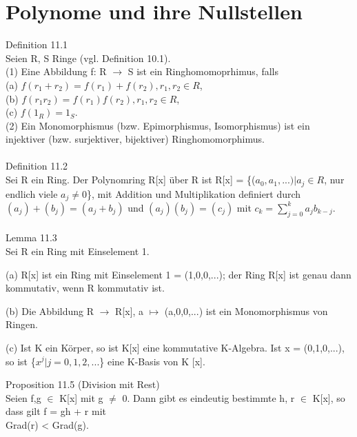 \documentclass[fontsize=10pt]{scrartcl}
\begin{document}
\section{Polynome und ihre Nullstellen}
Definition 11.1\\
Seien R, S Ringe (vgl. Definition 10.1).\\
(1) Eine Abbildung f: R $\to$ S ist ein Ringhomomoprhimus, falls\\
\hspace*{6.5mm}(a) $f(r_1 +r_2) = f(r_1) + f(r_2), r_1,r_2 \in R$,\\
\hspace*{6.5mm}(b) $f(r_1r_2) = f(r_1)f(r_2), r_1,r_2 \in R$,\\
\hspace*{6.5mm}(c) $f(1_R) = 1_S$.\\
(2) Ein Monomorphismus (bzw. Epimorphismus, Isomorphismus) ist ein injektiver (bzw. surjektiver, bijektiver) \hspace*{4.5mm} Ringhomomorphimus.\\
\\
Definition 11.2\\
Sei R ein Ring. Der Polynomring R[x] über R ist R[x] = \{($a_0,a_1,...) | a_j \in R$, nur endlich viele $a_j \neq 0$\},
mit Addition und Multiplikation definiert durch $(a_j) + (b_j) = (a_j + b_j)$ und $(a_j)(b_j) = (c_j)$ mit $c_k = \sum\nolimits_{j=0}^{k} a_j b_{k-j}$.\\
\\
Lemma 11.3\\
Sei R ein Ring mit Einselement 1.
\begin{compactenum}
\item[(a)] R[x] ist ein Ring mit Einselement 1 = (1,0,0,...); der Ring R[x] ist genau dann kommutativ, wenn R kommutativ ist.
\item[(b)] Die Abbildung R $\to$ R[x], a $\mapsto$ (a,0,0,...) ist ein Monomorphismus von Ringen.
\item[(c)] Ist K ein Körper, so ist K[x] eine kommutative K-Algebra. Ist x = (0,1,0,...), so ist \{$x^j | j = 0,1,2,...$\} eine K-Basis von K [x].\\
\end{compactenum}
Proposition 11.5 (Division mit Rest)\\
Seien f,g $\in$ K[x] mit g $\neq$ 0. Dann gibt es eindeutig bestimmte h, r $\in$ K[x], so dass gilt f = gh + r mit \\Grad(r) < Grad(g).\\
\\
\end{document}
